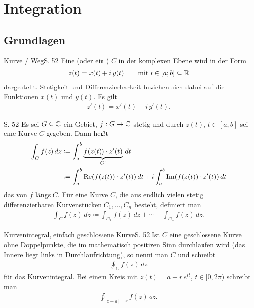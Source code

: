 \section{Integration}



\subsection{Grundlagen}

\begin{bemerkung}{Kurve / Weg}{S. 52}
  Eine  (oder ein ) $C$ in der komplexen Ebene wird in der Form
  \begin{align}
    z(t) = x(t) + i \, y(t) \qquad \text{mit } t \in [a; b] \subseteq \mathbb{R}
  \end{align}
  dargestellt.
  Stetigkeit und Differenzierbarkeit beziehen sich dabei auf die Funktionen $x(t)$ und $y(t)$.
  Es gilt
  \begin{align}
    z'(t) = x'(t) + i \, y'(t) .
  \end{align}
\end{bemerkung}

\begin{definition}[Kurvenintegral]{S. 52}
  \label{def:Kurvenintegral}
  Es sei $G \subseteq \mathbb{C}$ ein Gebiet, $f: G \to \mathbb{C}$ stetig und durch $z(t)$, $t \in [a,b]$ sei eine  Kurve $C$ gegeben.
  Dann heißt
  \begin{align}
    \int_C f(z) \, dz
    &\coloneqq \int_a^b \underbrace{ f(z(t)) \cdot z'(t)}_{\in \mathbb{C}} \, dt \\
    &\coloneqq \int_a^b \operatorname{Re}(f(z(t)) \cdot z'(t)) \, dt + i \int_a^b \operatorname{Im}(f(z(t)) \cdot z'(t)) \, dt
  \end{align}
  das  von $f$ längs $C$.
  Für eine Kurve $C$, die aus endlich vielen stetig differenzierbaren Kurvenstücken $C_1, \dots, C_n$ besteht, definiert man
  \begin{align}
  \int_C f(z) \, dz \coloneqq \int_{C_1} f(z) \, dz + \cdots + \int_{C_n} f(z) \, dz .
  \end{align}
\end{definition}

\begin{bemerkung}{Kurvenintegral, einfach geschlossene Kurve}{S. 52}
  Ist $C$ eine geschlossene Kurve ohne Doppelpunkte, die im mathematisch positiven Sinn durchlaufen wird (das Innere liegt links in Durchlaufrichtung), so nennt man $C$  und schreibt
  \begin{align}
    \oint_C f(z) \, dz
  \end{align}
  für das Kurvenintegral.
  Bei einem Kreis mit $z(t) = a + r\, e^{it}$, $t \in [0, 2\pi)$ schreibt man
  \begin{align}
    \oint_{|z-a|=r} f(z) \, dz .
  \end{align}
\end{bemerkung}


